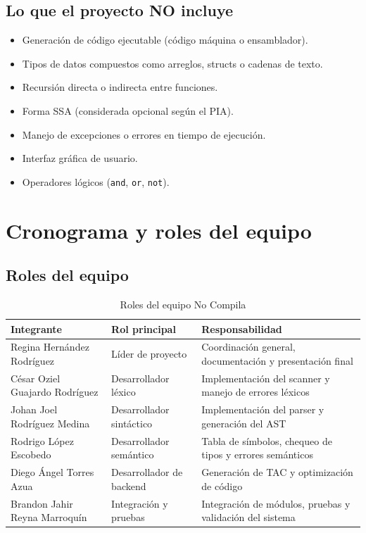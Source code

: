\documentclass[12pt]{article}
\begin{document}
\subsection{Lo que el proyecto NO incluye}

\begin{itemize}
    \item Generación de código ejecutable (código máquina o ensamblador).

    \item Tipos de datos compuestos como arreglos, structs o cadenas de
          texto.

    \item Recursión directa o indirecta entre funciones.

    \item Forma SSA (considerada opcional según el PIA).

    \item Manejo de excepciones o errores en tiempo de ejecución.

    \item Interfaz gráfica de usuario.

    \item Operadores lógicos (\texttt{and}, \texttt{or}, \texttt{not}).
\end{itemize}

\section{Cronograma y roles del equipo}

\subsection{Roles del equipo}
\begin{table}[H]
\centering
\renewcommand{\arraystretch}{1.25}
\begin{tabular}{@{}p{5.5cm} p{3.2cm} p{4.3cm}@{}}
\toprule
\textbf{Integrante} & \textbf{Rol principal} & \textbf{Responsabilidad} \\
\midrule
Regina Hernández Rodríguez
    & Líder de proyecto
    & Coordinación general, documentación y presentación final \\
César Oziel Guajardo Rodríguez
    & Desarrollador léxico
    & Implementación del scanner y manejo de errores léxicos \\
Johan Joel Rodríguez Medina
    & Desarrollador sintáctico
    & Implementación del parser y generación del AST \\
Rodrigo López Escobedo
    & Desarrollador semántico
    & Tabla de símbolos, chequeo de tipos y errores semánticos \\
Diego Ángel Torres Azua
    & Desarrollador de backend
    & Generación de TAC y optimización de código \\
Brandon Jahir Reyna Marroquín
    & Integración y pruebas
    & Integración de módulos, pruebas y validación del sistema \\
\bottomrule
\end{tabular}
\caption{Roles del equipo No Compila}
\end{table}
\end{document}
